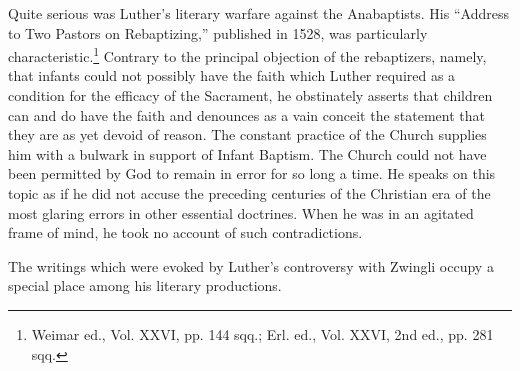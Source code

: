 Quite serious was Luther’s literary warfare against the Anabaptists.
His “Address to Two Pastors on Rebaptizing,” published in 1528,
was particularly characteristic.\footnote{Weimar ed., Vol. XXVI, pp. 144 sqq.; Erl. ed., Vol. XXVI, 2nd ed., pp. 281 sqq.}
 Contrary to the principal objection
of the rebaptizers, namely, that infants could not possibly have the
faith which Luther required as a condition for the efficacy of the
Sacrament, he obstinately asserts that children can and do have the
faith and denounces as a vain conceit the statement that they are as
yet devoid of reason. The constant practice of the Church supplies him
with a bulwark in support of Infant Baptism. The Church could not
have been permitted by God to remain in error for so long a time. He
speaks on this topic as if he did not accuse the preceding centuries of
the Christian era of the most glaring errors in other essential doctrines.
When he was in an agitated frame of mind, he took no account of such
contradictions.

The writings which were evoked by Luther’s controversy with
Zwingli occupy a special place among his literary productions.
